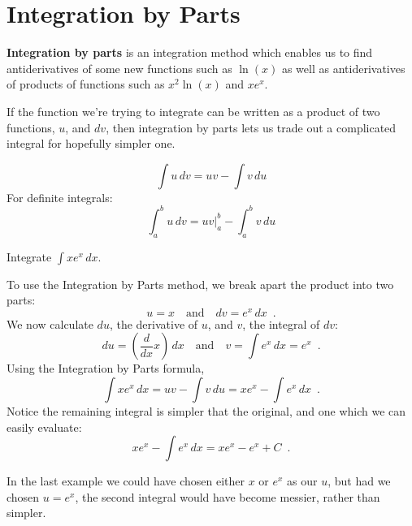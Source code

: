 \section{Integration by Parts}
\label{sec:integration-by-parts}
{\bf Integration by parts} is an integration method which enables us to find antiderivatives of some new functions such as $\ln(x)$ as well as antiderivatives of products of functions such as $x^2\ln(x)$ and $xe^x$.

If the function we're trying to integrate can be written as a product of two functions, $u$, and $dv$, then integration by parts lets us trade out a complicated integral for hopefully simpler one.

\begin{theorem}
$$\int u\,dv=uv-\int v\,du$$
For definite integrals:
$$\int_a^bu\,dv = \left.uv\right|_a^b - \int_a^b v \,du$$
\end{theorem}
\begin{example}
Integrate $\displaystyle\int xe^x\,dx$.

\begin{solution}
To use the Integration by Parts method, we break apart the product into two parts:
$$u=x\quad \text{and}\quad dv=e^x\,dx \enspace .$$
We now calculate $du$, the derivative of $u$, and $v$, the integral of $dv$:
$$du = \left(\frac{d}{dx}x\right)\,dx \quad \text{and} \quad v = \int e^x\,dx = e^x \enspace .$$
Using the Integration by Parts formula,
$$\int xe^x\,dx = uv-\int v\,du = xe^x - \int e^x\,dx \enspace . $$
Notice the remaining integral is simpler that the original, and one which we can easily evaluate:
$$xe^x-\int e^x\,dx = xe^x - e^x + C \enspace .$$
\end{solution}\end{example}

In the last example we could have chosen either $x$ or $e^x$ as our $u$, but had we chosen $u=e^x$, the second integral would have become messier, rather than simpler.

